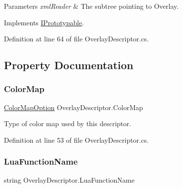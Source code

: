 \begin{DoxyParams}{Parameters}
{\em xml\+Reader} & The subtree pointing to Overlay.\\
\hline
\end{DoxyParams}


Implements \hyperlink{interface_i_prototypable_a024d752c4be655a7166db5718f1fad6a}{I\+Prototypable}.



Definition at line 64 of file Overlay\+Descriptor.\+cs.



\subsection{Property Documentation}
\mbox{\label{class_overlay_descriptor_ad6059c6ff98838034b392330e33b8217}} 
\subsubsection{\texorpdfstring{Color\+Map}{ColorMap}}
{\footnotesize\ttfamily \hyperlink{class_overlay_descriptor_ace98995d8c49c9395934100f3e5e1240}{Color\+Map\+Option} Overlay\+Descriptor.\+Color\+Map\hspace{0.3cm}{\ttfamily [get]}}



Type of color map used by this descriptor. 



Definition at line 53 of file Overlay\+Descriptor.\+cs.

\mbox{\label{class_overlay_descriptor_a926c5e857cd945f6a2f560d71c79a927}} 
\subsubsection{\texorpdfstring{Lua\+Function\+Name}{LuaFunctionName}}
{\footnotesize\ttfamily string Overlay\+Descriptor.\+Lua\+Function\+Name\hspace{0.3cm}{\ttfamily [get]}}



